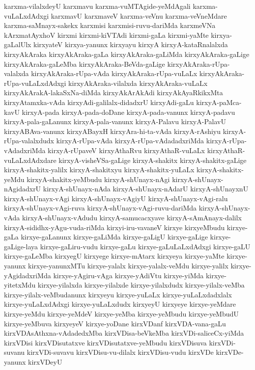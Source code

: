 {karxma-vilalxdeyU
karxmavu
karxma-vuMTAgide-yeMdAgali
karxma-vuLaLxdAdxgi
karxmavU
karxmaveV
karxma-veVnu
karxma-veVneMdare
karxma-saMnayx-sakekx
karxmisi
karxmisi-ruvu-dariMda
karxmeVNa
kArxmatAyxhoV
kirxmi
kirxmi-kiVTAdi
kirxmi-gaLa
kirxmi-yaMte
kirxya-gaLalUlx
kirxyateV
kirxya-yanunx
kirxyayu
kirxyA
kirxyA-kataRnalalxda
kirxyAkAraka
kirxyAkAraka-gaLa
kirxyAkAraka-gaLiMda
kirxyAkAraka-gaLige
kirxyAkAraka-gaLeMba
kirxyAkAraka-BeVda-gaLige
kirxyAkAraka-rUpa-valalxda
kirxyAkAraka-rUpa-vAda
kirxyAkAraka-rUpa-vuLaLx
kirxyAkAraka-rUpa-vuLaLxdAdxgi
kirxyAkAraka-vilalxda
kirxyAkAraka-vuLaLx
kirxyAkArakA-lakaSxNa-diMda
kirxyAkArAkAdi
kirxyAkAyaRkikxMta
kirxyAtamxka-vAda
kirxyAdi-galilalx-didadxrU
kirxyAdi-gaLu
kirxyA-paMca-kavU
kirxyA-pada
kirxyA-pada-doDane
kirxyA-pada-vanunx
kirxyA-padavu
kirxyA-pala-gaLanunx
kirxyA-pala-vanunx
kirxyA-Palavu
kirxyA-PalavU
kirxyABAva-vanunx
kirxyABayxH
kirxyAra-hi-ta-vAda
kirxyA-rAshiyu
kirxyA-rUpa-valalxdudx
kirxyA-rUpa-vAda
kirxyA-rUpa-vAdadadxriMda
kirxyA-rUpa-vAdadxriMda
kirxyA-rUpaveV
kirxyAthaRvu
kirxyAthaR-vuLaLx
kirxyAthaR-vuLaLxdAdxdare
kirxyA-visheVSa-gaLige
kirxyA-shakitx
kirxyA-shakitx-gaLige
kirxyA-shakitx-yalilx
kirxyA-shakitxyu
kirxyA-shakitx-yuLaLx
kirxyA-shakitx-yeMdu
kirxyA-shakitx-yeMbudu
kirxyA-shUnayx-nAgi
kirxyA-shUnayx-nAgidadxrU
kirxyA-shUnayx-nAda
kirxyA-shUnayx-nAdarU
kirxyA-shUnayxnU
kirxyA-shUnayx-vAgi
kirxyA-shUnayx-vAgiyU
kirxyA-shUnayx-vAgi-ralu
kirxyA-shUnayx-vAgi-ruva
kirxyA-shUnayx-vAgi-ruvu-dariMda
kirxyA-shUnayx-vAda
kirxyA-shUnayx-vAdudu
kirxyA-samucacxyave
kirxyA-sAmAnayx-dalilx
kirxyA-sididhx-yAgu-vuda-riMda
kirxyi-iru-vavaneV
kirxye
kirxyeMbudu
kirxye-gaLa
kirxye-gaLanunx
kirxye-gaLiMda
kirxye-gaLigU
kirxye-gaLige
kirxye-gaLige-laya
kirxye-gaLiru-vudu
kirxye-gaLu
kirxye-gaLuLaLxdAdxgi
kirxye-gaLU
kirxye-gaLeMba
kirxyegU
kirxyege
kirxye-mAtarx
kirxyeya
kirxye-yaMte
kirxye-yanunx
kirxye-yanunxMTu
kirxye-yalalx
kirxye-yalalx-veMdu
kirxye-yalilx
kirxye-yAgidadxriMda
kirxye-yAgiru-vAga
kirxye-yAdiVtu
kirxye-yiMda
kirxye-yitetxMdu
kirxye-yilalxda
kirxye-yilalxde
kirxye-yilalxdudx
kirxye-yilalx-veMba
kirxye-yilalx-veMbudanunx
kirxyeyu
kirxye-yuLaLx
kirxye-yuLaLxdadxlalx
kirxye-yuLaLxdAdxgi
kirxye-yuLaLxdudx
kirxyeyU
kirxyeye
kirxye-yeMdare
kirxye-yeMdu
kirxye-yeMdeV
kirxye-yeMba
kirxye-yeMbudu
kirxye-yeMbudU
kirxye-yeMbuva
kirxyeyeV
kirxye-yoDane
kirxVDanf
kirxVDA-vana-gaLu
kirxVDAsAthxna-vAdadedxMba
kirxVDisa-beVkeMba
kirxVDi-saliceCx-yiMda
kirxVDisi
kirxVDisutatxve
kirxVDisutatxve-yeMbudu
kirxVDisuva
kirxVDi-suvanu
kirxVDi-suvavu
kirxVDisu-vu-dilalx
kirxVDisu-vudu
kirxVDe
kirxVDe-yanunx
kirxVDeyU
}
